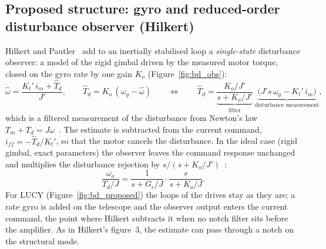 \documentclass[10pt,a4paper]{article}
\numberwithin{equation}{section}
\begin{document}
\subsection{Proposed structure: gyro and reduced-order disturbance observer (Hilkert)}
Hilkert and Pautler~\cite{hilkert2011} add to an inertially stabilised loop a \emph{single-state} disturbance observer: a model of the rigid gimbal driven by the measured motor torque, closed on the gyro rate by one gain $K_o$ (Figure~\ref{fig:bd_obs}):
\begin{equation}
\dot{\hat\omega}=\frac{K_t'\,i_m+\hat T_d}{J'},\qquad \hat T_d=K_o\,(\omega_g-\hat\omega)
\qquad\Longleftrightarrow\qquad
\hat T_d=\underbrace{\frac{K_o/J'}{s+K_o/J'}}_{\text{filter}}\ \underbrace{\bigl(J's\,\omega_g-K_t'\,i_m\bigr)}_{\text{disturbance measurement}} ,\label{eq:obs}
\end{equation}
which is a filtered measurement of the disturbance from Newton's law $T_m+T_d=J\dot\omega$~\cite[eqs.~1--2]{hilkert2011}. The estimate is subtracted from the current command, $i_{ff}=-\hat T_d/K_t'$, so that the motor cancels the disturbance. In the ideal case (rigid gimbal, exact parameters) the observer leaves the command response unchanged and multiplies the disturbance rejection by $s/(s+K_o/J')$~\cite[eqs.~5--6]{hilkert2011}:
\begin{equation}
\frac{\omega_o}{T_d/J}=\frac{1}{s+G_c/J}\cdot\frac{s}{s+K_o/J}.\label{eq:rej}
\end{equation}
For LUCY (Figure~\ref{fig:bd_proposed}) the loops of the drives stay as they are; a rate gyro is added on the telescope and the observer output enters the current command, the point where Hilkert subtracts it when no notch filter sits before the amplifier. As in Hilkert's figure~3, the estimate can pass through a notch on the structural mode.
\end{document}
